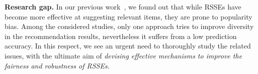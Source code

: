 \textbf{Research gap.} %
In our previous work~\cite{10174041}, we found out that while RSSEs have become more effective at suggesting relevant items, they are prone to popularity bias. %
Among the considered studies, only one approach tries to improve diversity in the recommendation results, nevertheless it suffers from a low prediction accuracy. %
In this respect, we see an urgent need to thoroughly study the related issues, %
with the ultimate aim of \emph{devising effective mechanisms to improve the fairness and robustness of RSSEs}. 





